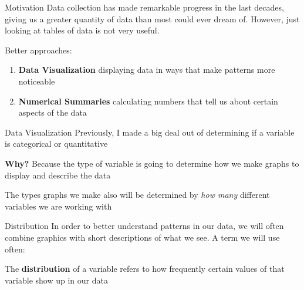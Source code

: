 \documentclass{beamer}
\begin{document}
\begin{frame}{Motivation}
Data collection has made remarkable progress in the last decades, giving us a greater quantity of data than most could ever dream of. However, just looking at tables of data is not very useful. \vspace{3mm} 

Better approaches:
\begin{enumerate}
    \item \textbf{Data Visualization} displaying data in ways that make patterns more noticeable
    \item \textbf{Numerical Summaries} calculating numbers that tell us about certain aspects of the data
\end{enumerate}
\end{frame}

\begin{frame}{Data Visualization}
    Previously, I made a big deal out of determining if a variable is categorical or quantitative \vspace{4mm}

    \textbf{Why?} Because the type of variable is going to determine how we make graphs to display and describe the data \vspace{4mm}

    The types graphs we make also will be determined by \textit{how many} different variables we are working with
\end{frame}

\begin{frame}{Distribution}
In order to better understand patterns in our data, we will often combine graphics with short descriptions of what we see. A term we will use often: \vspace{10mm}

The \textbf{distribution} of a variable refers to how frequently certain values of that variable show up in our data 
\end{frame}
\end{document}
